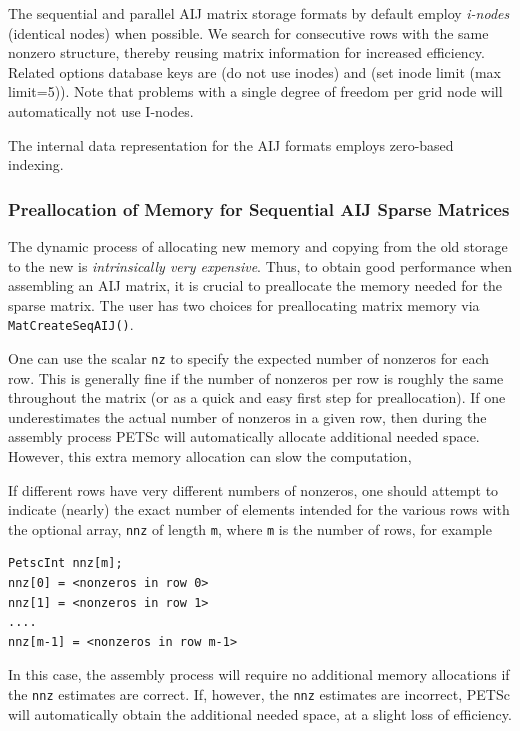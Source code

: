 The sequential and parallel AIJ matrix storage formats by default
employ {\em i-nodes} (identical nodes) when possible.  We search for
consecutive rows with the same nonzero structure, thereby reusing
matrix information for increased efficiency.  Related options database
keys are  (do not use inodes) and 
 (set inode limit (max limit=5)).
Note that problems with a single degree of freedom per grid node
will automatically not use I-nodes.

The internal data representation for the AIJ formats employs
zero-based indexing.

\subsubsection{Preallocation of Memory for Sequential AIJ Sparse Matrices}

The dynamic process of allocating new memory and copying from the old
storage to the new is {\em intrinsically very expensive}.  Thus, to
obtain good performance when assembling an AIJ matrix, it is crucial
to preallocate the memory needed for the sparse matrix.  The user has
two choices for preallocating matrix memory via \lstinline{MatCreateSeqAIJ()}.

One can use the scalar \lstinline{nz} to specify the expected
number of nonzeros for each row.  This is generally fine if the number
of nonzeros per row is roughly the same throughout the matrix (or as a
quick and easy first step for preallocation).  If one underestimates
the actual number of nonzeros in a given row, then during the assembly
process PETSc will automatically allocate additional needed space.
However, this extra memory allocation can slow the computation,

If different rows have very different numbers of nonzeros, one
should attempt to indicate (nearly) the exact number of elements
intended for the various rows with the optional array, \lstinline{nnz} of
length \lstinline{m}, where \lstinline{m} is the number of rows, for example
\begin{lstlisting}
PetscInt nnz[m];
nnz[0] = <nonzeros in row 0>
nnz[1] = <nonzeros in row 1>
....
nnz[m-1] = <nonzeros in row m-1>
\end{lstlisting}
In this case, the assembly process will require no additional memory
allocations if the \lstinline{nnz} estimates are correct. If, however,
the \lstinline{nnz} estimates are incorrect, PETSc will automatically
obtain the additional needed space, at a slight loss of efficiency.


